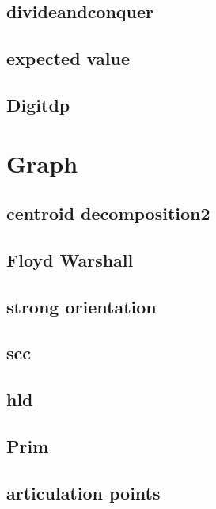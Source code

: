 \subsection{divideandconquer}
\raggedbottom
\hrulefill
\subsection{expected value}
\raggedbottom
\hrulefill
\subsection{Digitdp}
\raggedbottom
\hrulefill

\section{Graph}
\subsection{centroid decomposition2}
\raggedbottom
\hrulefill
\subsection{Floyd Warshall}
\raggedbottom
\hrulefill
\subsection{strong orientation}
\raggedbottom
\hrulefill
\subsection{scc}
\raggedbottom
\hrulefill
\subsection{hld}
\raggedbottom
\hrulefill
\subsection{Prim}
\raggedbottom
\hrulefill
\subsection{articulation points}
\raggedbottom
\hrulefill
